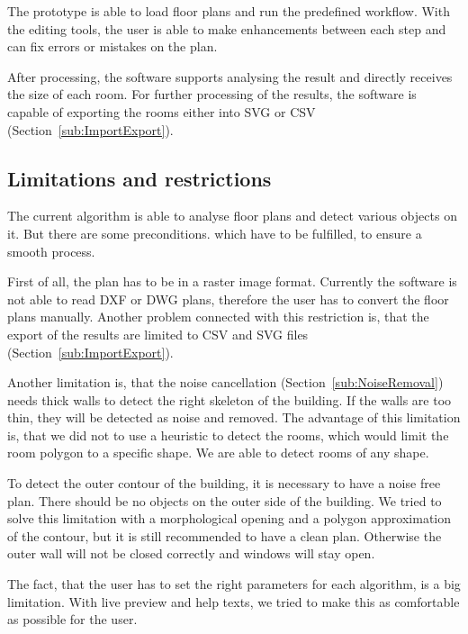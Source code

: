 The prototype is able to load floor plans and run the predefined workflow. With the editing tools, the user is able to make enhancements between each step and can fix errors or mistakes on the plan.

After processing, the software supports analysing the result and directly receives the size of each room. For further processing of the results, the software is capable of exporting the rooms either into SVG or CSV (Section~\ref{sub:ImportExport}).

\subsection{Limitations and restrictions}
The current algorithm is able to analyse floor plans and detect various objects on it. But there are some preconditions. which have to be fulfilled, to ensure a smooth process.

First of all, the plan has to be in a raster image format. Currently the software is not able to read DXF or DWG plans, therefore the user has to convert the floor plans manually. Another problem connected with this restriction is, that the export of the results are limited to CSV and SVG files (Section~\ref{sub:ImportExport}).

Another limitation is, that the noise cancellation (Section~\ref{sub:NoiseRemoval}) needs thick walls to detect the right skeleton of the building. If the walls are too thin, they will be detected as noise and removed. The advantage of this limitation is, that we did not to use a heuristic to detect the rooms, which would limit the room polygon to a specific shape. We are able to detect rooms of any shape.

To detect the outer contour of the building, it is necessary to have a noise free plan. There should be no objects on the outer side of the building. We tried to solve this limitation with a morphological opening and a polygon approximation of the contour, but it is still recommended to have a clean plan. Otherwise the outer wall will not be closed correctly and windows will stay open.

The fact, that the user has to set the right parameters for each algorithm, is a big limitation. With live preview and help texts, we tried to make this as comfortable as possible for the user.

